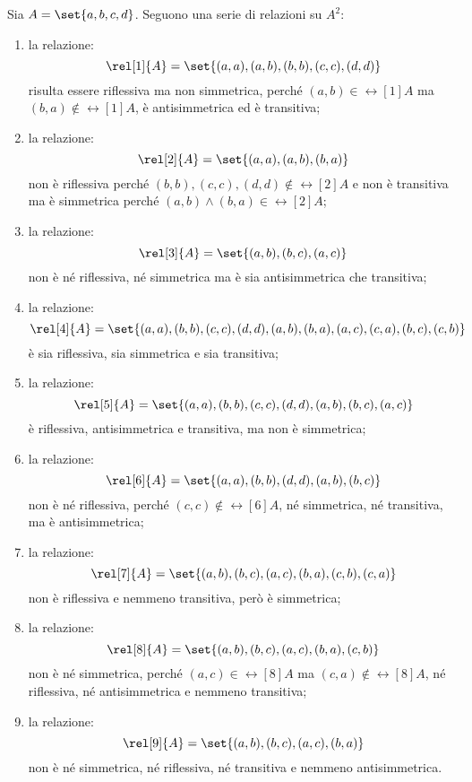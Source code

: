 \begin{examples}
    Sia \(A = \set{a, b, c, d}\). Seguono una serie di relazioni su \(A^2\):
    \begin{enumerate}
        \item la relazione:
            \[
                \rel[1]{A} = \set{(a, a), (a, b), (b, b), (c, c), (d, d)}
            \]
            risulta essere riflessiva ma non simmetrica, perché \((a, b) \in \rel[1]{A}\) ma \((b, a) \notin \rel[1]{A}\), è antisimmetrica ed è transitiva;
%
        \item la relazione:
            \[
                \rel[2]{A} = \set{(a, a), (a, b), (b, a)}
            \]
            non è riflessiva perché \((b, b), (c, c), (d, d) \notin \rel[2]{A}\) e non è transitiva ma è simmetrica perché \((a, b) \land (b, a) \in \rel[2]{A}\);
%
        \item la relazione:
            \[
                \rel[3]{A} = \set{(a, b), (b, c), (a, c)}
            \]
            non è né riflessiva, né simmetrica ma è sia antisimmetrica che transitiva;
%
        \item la relazione:
            \[
                \rel[4]{A} = \set{(a, a), (b, b), (c, c), (d, d), (a, b), (b, a), (a, c), (c, a), (b, c), (c, b)}
            \]
            è sia riflessiva, sia simmetrica e sia transitiva;
%
        \item la relazione:
            \[
                \rel[5]{A} = \set{(a, a), (b, b), (c, c), (d, d), (a, b), (b, c), (a, c)}
            \]
            è riflessiva, antisimmetrica e transitiva, ma non è simmetrica; 
%
        \item la relazione:
            \[
                \rel[6]{A} = \set{(a, a), (b, b), (d, d), (a, b), (b, c)}
            \]
            non è né riflessiva, perché \((c, c) \notin \rel[6]{A}\), né simmetrica, né transitiva, ma è antisimmetrica;
% 
        \item la relazione:
            \[
                \rel[7]{A} = \set{(a, b), (b, c), (a, c), (b, a), (c, b), (c, a)}
            \]
            non è riflessiva e nemmeno transitiva, però è simmetrica;
%
        \item la relazione:
            \[
                \rel[8]{A} = \set{(a, b), (b, c), (a, c), (b, a), (c, b)}
            \]
            non è né simmetrica, perché \((a, c) \in \rel[8]{A}\) ma \((c, a) \notin \rel[8]{A}\), né riflessiva, né antisimmetrica e nemmeno transitiva;
%
        \item la relazione:
            \[
                \rel[9]{A} = \set{(a, b), (b, c), (a, c), (b, a)}
            \]
            non è né simmetrica, né riflessiva, né transitiva e nemmeno antisimmetrica.
    \end{enumerate}
\end{examples}

